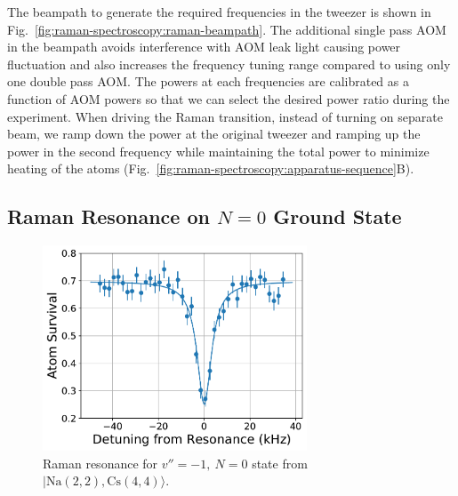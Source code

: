 The beampath to generate the required frequencies in the tweezer is shown in
Fig.~\ref{fig:raman-spectroscopy:raman-beampath}.
The additional single pass AOM in the beampath avoids interference
with AOM leak light causing power fluctuation and
also increases the frequency tuning range compared to using only one double pass AOM.
The powers at each frequencies are calibrated as a function of AOM powers
so that we can select the desired power ratio during the experiment.
When driving the Raman transition, instead of turning on separate beam,
we ramp down the power at the original tweezer and ramping up the power
in the second frequency while maintaining the total power to minimize heating of the atoms
(Fig.~\ref{fig:raman-spectroscopy:apparatus-sequence}B).

\subsection{Raman Resonance on $N=0$ Ground State}
\label{ch:raman-spectroscopy:states:n0}

\begin{figure}
  \centering
  \includegraphics[width=0.7\textwidth]{figures/raman_spectroscopy_resonance.pdf}
  \caption[Raman resonance for $v''=-1,\ N=0$ state]{
    Raman resonance for $v''=-1,\ N=0$ state from $|\mathrm{Na(2, 2),Cs(4, 4)}\rangle$.
    \label{fig:raman-spectroscopy:resonance}}
\end{figure}

